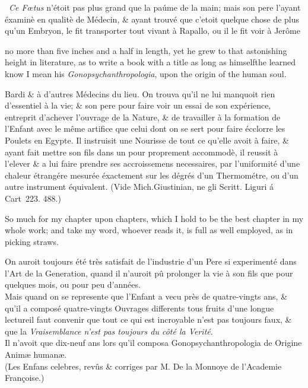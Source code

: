 \documentclass{article}
\begin{document}
\bgroup\footnotesize
\indent\fnast\ \textit{Ce Fœtus} n’étoit pas plus
grand que la paúme de la main; mais son pere l’ayant éxaminè
en qua\-litè de Médecin, \& ayant trouvé que c’etoit quelque
chose de plus qu’un Embryon, le fit transporter tout vivant
à Rapallo, ou il le fit voir à Jerôme\break
{}\par\egroup

\newpage\noindent
no more than five inches and a half in length, yet he grew
to that astonishing height in literature, as to write a book
with a title as long as himself\tsk the learned know I mean
his \textit{Gono\-psych\-an\-thropo\-logia}, upon the origin
of the human soul.\hfill\break{}


\vfill
\bgroup\footnotesize
\noindent
Bardi \& à d’autres
Médecins du lieu.  On trouva qu’il ne lui manquoit rien
d’essentiel à la vie; \& son pere pour faire voir un essai
de son expérience, entreprit d’achever l’ouvrage de la
Nature, \& de travailler à la formation de l’Enfant avec le
même artifice que celui dont on se sert pour faire écclorre
les Poulets en Egypte. Il instruisit une Nourisse de tout ce
qu’elle avoit à faire, \& ayant fait mettre son fils dans un
pour proprement accommodè, il reussit à l’elever \& a lui
faire prendre ses accroissemens necessaires, par
l’uniformité d’une chaleur étrangére mesurée éxactement sur
les dégrés d’un Thermométre, ou d’un autre instrument
équivalent. (Vide Mich.\@  Giustinian, ne gli Scritt.\@
Liguri á
Cart~223. 488.)\hfill\break{}\par\egroup
\newpage
So much for my chapter upon chapters, which I hold
to be the best chapter in my whole work; and take my word, whoever
reads it, is full as well employed, as in picking straws.

\vfill


\vfill

\bgroup\footnotesize
On auroit toujours été très satisfait de l’industrie d’un Pere si
experimenté dans l’Art de la Generation, quand il n’auroit pû
prolonger la vie à son fils que pour quelques mois, ou pour peu
d’années.\\
\indent
Mais quand on se represente que l’Enfant a vecu près de quatre-vingts
ans, \& qu’il a composé quatre-vingts Ouvrages differents tous fruits
d’une longue lecture\tsk il faut convenir que tout ce qui est
incroyable n’est pas toujours faux, \& que la \textit{Vraisemblance
n’est pas toujours du côté la Verité}.\\
\indent
Il n’avoit que dix-neuf ans lors qu’il composa
Gonopsychanthropologia de Origine Animæ humanæ.\\
\indent
(Les Enfans celebres, revûs \& corriges par M. De la Monnoye de
l’Academie Françoise.)\par\egroup
\end{document}
